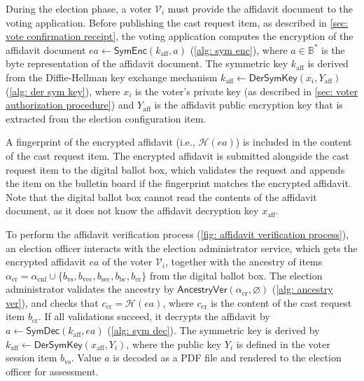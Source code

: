 During the election phase, a voter $\mathcal{V}_i$ must provide the affidavit document to the voting application. Before publishing the cast request item, as described in \cref{sec: vote confirmation receipt}, the voting application computes the encryption of the affidavit document $ea \gets \mathsf{SymEnc} (k_\mathrm{aff}, a)$ (\cref{alg: sym enc}), where $a \in \mathbb{B}^*$ is the byte representation of the affidavit document. The symmetric key $k_\mathrm{aff}$ is derived from the Diffie-Hellman key exchange mechanism $k_\mathrm{aff} \gets \mathsf{DerSymKey} (x_i, Y_\mathrm{aff})$ (\cref{alg: der sym key}), where $x_i$ is the voter's private key (as described in \cref{sec: voter authorization procedure}) and $Y_\mathrm{aff}$ is the affidavit public encryption key that is extracted from the election configuration item.

A fingerprint of the encrypted affidavit (i.e., $\mathcal{H} (ea)$) is included in the content of the cast request item. The encrypted affidavit is submitted alongside the cast request item to the digital ballot box, which validates the request and appends the item on the bulletin board if the fingerprint matches the encrypted affidavit. Note that the digital ballot box cannot read the contents of the affidavit document, as it does not know the affidavit decryption key $x_\mathrm{aff}$.

To perform the affidavit verification process (\cref{fig: affidavit verification process}), an election officer interacts with the election administrator service, which gets the encrypted affidavit $ea$ of the voter $\mathcal{V}_i$, together with the ancestry of items $\alpha_\mathrm{cr} = \alpha_\mathrm{cnf} \cup \{ b_\mathrm{vs}, b_\mathrm{vec}, b_\mathrm{sec}, b_\mathrm{bc}, b_\mathrm{cr} \}$ from the digital ballot box. The election administrator validates the ancestry by $\mathsf{AncestryVer} (\alpha_\mathrm{cr}, \varnothing)$ (\cref{alg: ancestry ver}), and checks that $c_\mathrm{cr} = \mathcal{H} (ea)$, where $c_\mathrm{cr}$ is the content of the cast request item $b_\mathrm{cr}$. If all validations succeed, it decrypts the affidavit by $a \gets \mathsf{SymDec} (k_\mathrm{aff}, ea)$ (\cref{alg: sym dec}). The symmetric key is derived by $k_\mathrm{aff} \gets \mathsf{DerSymKey} (x_\mathrm{aff}, Y_i)$, where the public key $Y_i$ is defined in the voter session item $b_\mathrm{vs}$. Value $a$ is decoded as a PDF file and rendered to the election officer for assessment.


